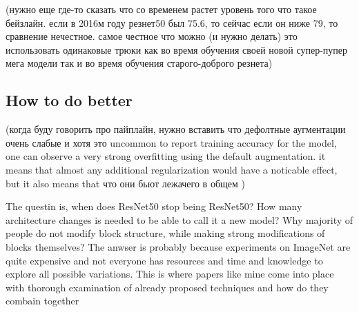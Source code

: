 







(нужно еще где-то сказать что со временем растет уровень того что такое бейзлайн. если в 2016м году резнет50 был 75.6, то сейчас если он ниже 79, то сравнение нечестное. самое честное что можно (и нужно делать) это использовать одинаковые трюки как во время обучения своей новой супер-пупер мега модели так и во время обучения старого-доброго резнета)



\subsection{How to do better}



(когда буду говорить про пайплайн, нужно вставить что дефолтные аугментации очень слабые и хотя это uncommon to report training accuracy for the model, one can observe a very strong overfitting using the default augmentation. it means that almost any additional regularization would have a noticable effect, but it also means that что они бьют лежачего в общем    )


The questin is, when does ResNet50 stop being ResNet50? How many architecture changes is needed to be able to call it a new model? Why majority of people do not modify block structure, while making strong modifications of blocks themselves? The anwser is probably because experiments on ImageNet are quite expensive and not everyone has resources and time and knowledge to explore all possible variations. This is where papers like mine come into place with thorough examination of already proposed techniques and how do they combain together

